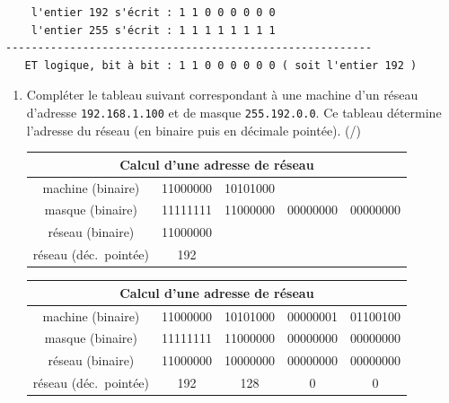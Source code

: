 \begin{verbatim}   
    l'entier 192 s'écrit : 1 1 0 0 0 0 0 0
    l'entier 255 s'écrit : 1 1 1 1 1 1 1 1
---------------------------------------------------------
   ET logique, bit à bit : 1 1 0 0 0 0 0 0 ( soit l'entier 192 )
\end{verbatim}
\begin{enumerate}[resume=monDS]
    \item Compléter le tableau suivant correspondant à une machine d'un réseau d'adresse \texttt{192.168.1.100} et de masque \texttt{255.192.0.0}. Ce tableau détermine l'adresse du réseau (en binaire puis en décimale pointée). (/)

    \begin{blocvisiblex}[height=4.5]
    {
    
    \centering
    \renewcommand{\arraystretch}{1.5} %
    \begin{tabular}{|c|c|c|c|c|}
        \hline
        \multicolumn{5}{|c|}{\textbf{Calcul d'une adresse de réseau}} \\ \hline
        machine (binaire)        & 11000000 & 10101000 &          &          \\ \hline
        masque (binaire)         & 11111111 & 11000000 & 00000000 & 00000000 \\ \hline
        réseau (binaire)         & 11000000 &          &          &          \\ \hline
        réseau (déc.\ pointée)    & 192      &          &          &          \\ \hline
    \end{tabular}
}
\centering
    \renewcommand{\arraystretch}{1.5} %
    \begin{tabular}{|c|c|c|c|c|}
        \hline
        \multicolumn{5}{|c|}{\textbf{Calcul d'une adresse de réseau}} \\ \hline
        machine (binaire)        & 11000000 & 10101000 & 00000001 & 01100100\\ \hline
        masque (binaire)         & 11111111 & 11000000 & 00000000 & 00000000 \\ \hline
        réseau (binaire)         & 11000000 & 10000000 & 00000000 & 00000000 \\ \hline
        réseau (déc.\ pointée)    & 192      & 128      & 0        & 0        \\ \hline
    \end{tabular}
    \end{blocvisiblex}

\end{enumerate}

